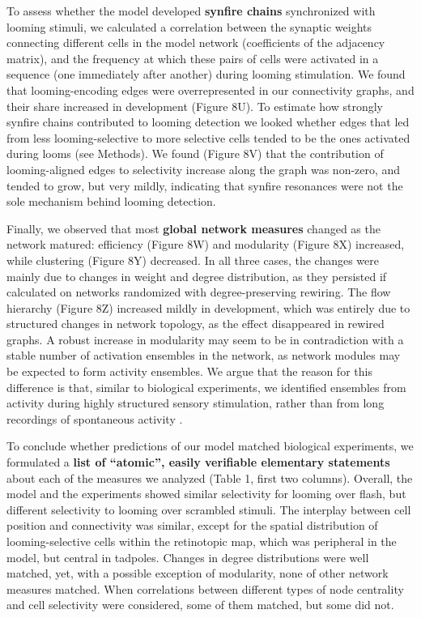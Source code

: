 \documentclass{article}
\begin{document}
To assess whether the model developed \textbf{synfire chains} synchronized with looming stimuli, we calculated a correlation between the synaptic weights connecting different cells in the model network (coefficients of the adjacency matrix), and the frequency at which these pairs of cells were activated in a sequence (one immediately after another) during looming stimulation. We found that looming-encoding edges were overrepresented in our connectivity graphs, and their share increased in development (Figure 8U). To estimate how strongly synfire chains contributed to looming detection we looked whether edges that led from less looming-selective to more selective cells tended to be the ones activated during looms (see Methods). We found (Figure 8V) that the contribution of looming-aligned edges to selectivity increase along the graph was non-zero, and tended to grow, but very mildly, indicating that synfire resonances were not the sole mechanism behind looming detection.

Finally, we observed that most \textbf{global network measures} changed as the network matured: efficiency (Figure 8W) and modularity (Figure 8X) increased, while clustering (Figure 8Y) decreased. In all three cases, the changes were mainly due to changes in weight and degree distribution, as they persisted if calculated on networks randomized with degree-preserving rewiring. The flow hierarchy (Figure 8Z) increased mildly in development, which was entirely due to structured changes in network topology, as the effect disappeared in rewired graphs. A robust increase in modularity may seem to be in contradiction with a stable number of activation ensembles in the network, as network modules may be expected to form activity ensembles. We argue that the reason for this difference is that, similar to biological experiments, we identified ensembles from activity during highly structured sensory stimulation, rather than from long recordings of spontaneous activity \citep{triplett2018emergence}.

To conclude whether predictions of our model matched biological experiments, we formulated a \textbf{list of “atomic”, easily verifiable elementary statements} about each of the measures we analyzed (Table 1, first two columns). Overall, the model and the experiments showed similar selectivity for looming over flash, but different selectivity to looming over scrambled stimuli. The interplay between cell position and connectivity was similar, except for the spatial distribution of looming-selective cells within the retinotopic map, which was peripheral in the model, but central in tadpoles. Changes in degree distributions were well matched, yet, with a possible exception of modularity, none of other network measures matched. When correlations between different types of node centrality and cell selectivity were considered, some of them matched, but some did not.
\end{document}
